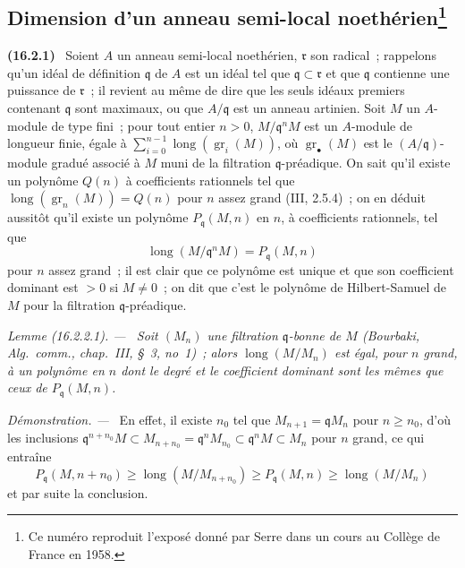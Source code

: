 \documentclass[10pt,oneside]{book}
\makeatletter
\newcommand{\gr}{\operatorname{gr}}
\newcommand{\setmanualcurrentlabel}[1]{\def\@currentlabel{#1}}
\newcommand{\oldpage}[2][]{%
  \setcounter{footnote}{0}%
  \marginpar{\scriptsize\textbf{#1}~|~#2}\ignorespaces}
\newenvironment{env}[1][]{\setmanualcurrentlabel{#1}\par\medskip\noindent\textbf{(#1)}\ }{\par}
\newenvironment{lemma}[1][]{%
  \setmanualcurrentlabel{#1}\par\medskip\noindent\itshape Lemme (#1). ---\ }{\par}
\newenvironment{proof}{%
  \par\medskip\noindent\textit{Démonstration. ---\ }}{\par}
\makeatother
\begin{document}
\subsection[Dimension d'un anneau semi-local noethérien]{Dimension d'un
anneau semi-local noethérien\protect\footnote{Ce numéro reproduit l'exposé
donné par Serre dans un cours au Collège de France en 1958.}}
\label{subsection:0.16.2-fr}

\begin{env}[16.2.1]
\label{0.16.2.1-fr}
Soient $A$ un anneau semi-local noethérien, $\mathfrak{r}$ son radical~;
rappelons qu'un idéal de définition $\mathfrak{q}$ de $A$ est un idéal tel que
$\mathfrak{q}\subset\mathfrak{r}$ et que $\mathfrak{q}$ contienne une
puissance de $\mathfrak{r}$~; il revient au même de dire que les seuls idéaux
premiers contenant $\mathfrak{q}$ sont maximaux, ou que $A/\mathfrak{q}$ est
un anneau artinien. Soit $M$ un $A$-module de type fini~; pour tout entier
$n>0$, $M/\mathfrak{q}^nM$ est un $A$-module de longueur finie, égale à
$\sum_{i=0}^{n-1}\operatorname{long}(\gr_i(M))$, où $\gr_\bullet(M)$ est le
$(A/\mathfrak{q})$-module gradué associé à $M$ muni de la filtration
$\mathfrak{q}$-préadique. On sait qu'il existe un polynôme $Q(n)$ à
coefficients rationnels tel que $\operatorname{long}(\gr_n(M))=Q(n)$ pour $n$
assez grand (III, 2.5.4)~; on en déduit aussitôt qu'il existe un polynôme
$P_{\mathfrak{q}}(M,n)$ en $n$, à coefficients rationnels, tel que
\[
  \operatorname{long}(M/\mathfrak{q}^nM)=P_{\mathfrak{q}}(M,n)
\]
pour $n$ assez grand~; il est clair que ce polynôme est unique et que son
coefficient dominant est $>0$ si $M\neq0$~; on dit que c'est le polynôme de
Hilbert-Samuel de $M$ pour la filtration $\mathfrak{q}$-préadique.
\end{env}

\begin{lemma}[16.2.2.1]
\label{0.16.2.2.1-fr}
\oldpage[0\textsubscript{IV-1}]{26}
Soit $(M_n)$ une filtration $\mathfrak{q}$-bonne de $M$ (Bourbaki,
\emph{Alg.~comm.}, chap.~III, \S~3, no~1)~; alors
$\operatorname{long}(M/M_n)$ est égal, pour $n$ grand, à un polynôme en $n$
dont le degré et le coefficient dominant sont les mêmes que ceux de
$P_{\mathfrak{q}}(M,n)$.
\end{lemma}

\begin{proof}
En effet, il existe $n_0$ tel que $M_{n+1}=\mathfrak{q}M_n$ pour $n\geq n_0$,
d'où les inclusions
$\mathfrak{q}^{n+n_0}M\subset M_{n+n_0}=\mathfrak{q}^nM_{n_0}
\subset\mathfrak{q}^nM\subset M_n$ pour $n$ grand, ce qui entraîne
\[
  P_{\mathfrak{q}}(M,n+n_0)\geq
  \operatorname{long}(M/M_{n+n_0})\geq
  P_{\mathfrak{q}}(M,n)\geq\operatorname{long}(M/M_n)
\]
et par suite la conclusion.
\end{proof}
\end{document}
